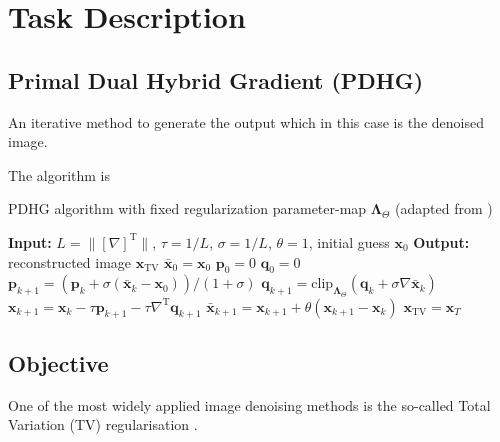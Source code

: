 \documentclass[12pt]{article}
\begin{document}
\section{Task Description}



\subsection{Primal Dual Hybrid Gradient (PDHG)}

An iterative method to generate the output which in this case is the denoised image. 

The algorithm is

\begin{algorithm}
\caption{PDHG algorithm with fixed regularization parameter-map $\boldsymbol{\Lambda}_\Theta$ (adapted from \cite{81})}
\begin{algorithmic}[1]
\STATE \textbf{Input:} $L = \| [\nabla]^\text{T} \|$, $\tau = 1/L$, $\sigma = 1/L$, $\theta = 1$, initial guess $\mathbf{x}_0$
\STATE \textbf{Output:} reconstructed image $\mathbf{x}_{\text{TV}}$
\STATE $\bar{\mathbf{x}}_0 = \mathbf{x}_0$
\STATE $\mathbf{p}_0 = 0$
\STATE $\mathbf{q}_0 = 0$
    \STATE $\mathbf{p}_{k+1} = \left(\mathbf{p}_k + \sigma ( \bar{\mathbf{x}}_k - \mathbf{x}_0)\right) / (1 + \sigma)$
    \STATE $\mathbf{q}_{k+1} = \text{clip}_{\boldsymbol{\Lambda}_\Theta} \left(\mathbf{q}_k + \sigma \nabla \bar{\mathbf{x}}_k \right)$
    \STATE $\mathbf{x}_{k+1} = \mathbf{x}_k - \tau \mathbf{p}_{k+1} - \tau \nabla^\text{T} \mathbf{q}_{k+1}$
    \STATE $\bar{\mathbf{x}}_{k+1} = \mathbf{x}_{k+1} + \theta (\mathbf{x}_{k+1} - \mathbf{x}_k)$
\ENDFOR
\STATE $\mathbf{x}_{\text{TV}} = \mathbf{x}_T$
\end{algorithmic}
\end{algorithm}



\subsection{Objective}


One of the most widely applied image denoising methods is the so-called Total Variation (TV) regularisation \cite{kofler2023learning}.
\end{document}
